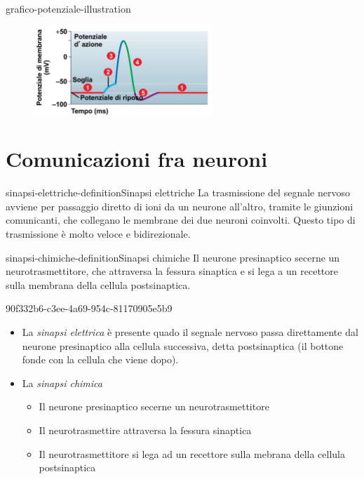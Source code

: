 \documentclass[preview]{standalone}
\begin{document}
\begin{snippet}{grafico-potenziale-illustration}
    \begin{center}
    \begin{figure}[ht]
        \centering
        \includegraphics[width=0.6\textwidth]{./resources/grafico_potenziale_membrana_neurone.png}
    \end{figure}
    \end{center}
\end{snippet}

\section{Comunicazioni fra neuroni}

\begin{snippetdefinition}{sinapsi-elettriche-definition}{Sinapsi elettriche}
    La trasmissione del segnale nervoso avviene per passaggio diretto di ioni da un neurone
    all'altro, tramite le giunzioni comunicanti, che collegano le membrane dei due neuroni
    coinvolti. Questo tipo di trasmissione è molto veloce e bidirezionale.
\end{snippetdefinition}

\begin{snippetdefinition}{sinapsi-chimiche-definition}{Sinapsi chimiche}
    Il neurone presinaptico secerne un neurotrasmettitore, che attraversa la fessura sinaptica
    e si lega a un recettore sulla membrana della cellula postsinaptica.
\end{snippetdefinition}

\begin{snippet}{90f332b6-c3ee-4a69-954c-81170905e5b9}
    \begin{itemize}
        \item  La \textit{sinapsi elettrica} è presente quado il segnale nervoso passa direttamente dal
        neurone presinaptico alla cellula successiva, detta postsinaptica (il bottone fonde con la cellula che viene dopo).
        \item La \textit{sinapsi chimica}
        \begin{itemize}
            \item Il neurone presinaptico secerne un neurotrasmettitore
            \item Il neurotrasmettire attraversa la fessura sinaptica
            \item Il neurotrasmettitore si lega ad un recettore sulla mebrana della cellula postsinaptica
        \end{itemize}
    \end{itemize}
\end{snippet}
\end{document}
